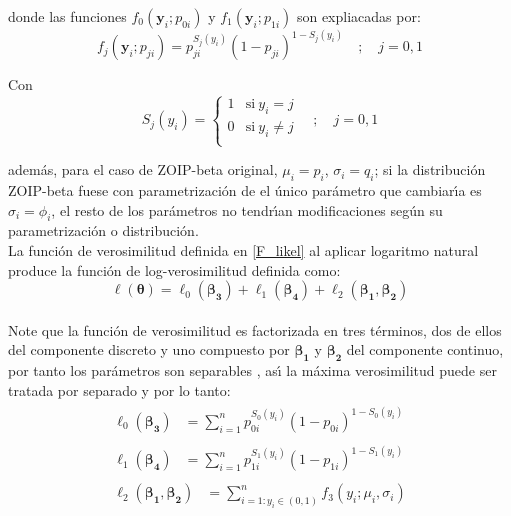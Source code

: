 donde las funciones $f_0(\mathbf{y}_i;p_{0i})$ y $f_1(\mathbf{y}_i;p_{1i})$ son expliacadas por:
\[
f_j(\mathbf{y}_i;p_{ji})={p_{ji}^{S_j(y_i)}(1-p_{ji})^{1-S_j(y_i)}} \quad ; \quad j=0,1
\]

Con
\[
S_j(y_i)=
\begin{cases}
1 & \text{si}\ y_i=j\\
0 & \text{si}\ y_i\neq j\\
\end{cases}
\quad ; \quad j=0,1
\]

adem\'{a}s, para el caso de ZOIP-beta original, $\mu_i=p_i$, $\sigma_i=q_i$; si la distribuci\'{o}n ZOIP-beta fuese con parametrizaci\'{o}n de \cite{Ferrari2} el \'{u}nico par\'{a}metro que cambiar\'{\i}a es $\sigma_i=\phi_i$, el resto de los par\'{a}metros no tendr\'{\i}an modificaciones seg\'{u}n su parametrizaci\'{o}n o distribuci\'{o}n.\\

La funci\'{o}n de verosimilitud definida en \eqref{F_likel} al aplicar logaritmo natural produce la funci\'{o}n de log-verosimilitud definida como:
\[
\ell(\boldsymbol{\theta})=\ell_0(\boldsymbol{\beta_3})+\ell_1(\boldsymbol{\beta_4})+\ell_2(\boldsymbol{\beta_1},\boldsymbol{\beta_2})
\]
\\
Note que la funci\'{o}n de verosimilitud es factorizada en tres t\'{e}rminos, dos de ellos del componente discreto y uno compuesto por $\boldsymbol{\beta_1}$ y $\boldsymbol{\beta_2}$ del componente continuo, por tanto los par\'{a}metros son separables \citep{Pace1}, as\'{\i} la m\'{a}xima verosimilitud puede ser tratada por separado y por lo tanto:\\
\begin{align*}
\begin{split}
	\ell_0(\boldsymbol{\beta_3}) &= \sum_{i=1}^{n}{p_{0i}^{S_0(y_i)}(1-p_{0i})^{1-S_0(y_i)}}
\end{split}\\
\begin{split}
	\ell_1(\boldsymbol{\beta_4}) &= \sum_{i=1}^{n}{p_{1i}^{S_1(y_i)}(1-p_{1i})^{1-S_1(y_i)}}
\end{split}\\
\begin{split}
	\ell_2(\boldsymbol{\beta_1},\boldsymbol{\beta_2}) &= \sum_{i=1:y_i \in (0,1)}^{n}{f_3(y_i;\mu_i,\sigma_i)} 
\end{split}
\end{align*}

